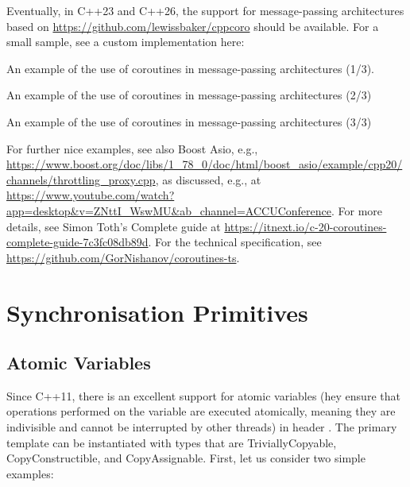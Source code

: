 \begin{itemize}
\begin{end}
Eventually, in C++23 and C++26, the support for message-passing architectures based on \url{https://github.com/lewissbaker/cppcoro} should be available. For a small sample, see a custom implementation here:

\raggedbottom
\begin{codebox}[]{\href{https://godbolt.org/z/KhYaGPn7e}{\ExternalLink}}
\footnotesize An example of the use of coroutines in message-passing architectures (1/3).
\tcblower
{}
\end{codebox}

\raggedbottom
\begin{codebox}[]{\href{https://godbolt.org/z/5vEsW6dKE}{\ExternalLink}}
\footnotesize An example of the use of coroutines in message-passing architectures (2/3)
\tcblower
{}
\end{codebox}

\raggedbottom
\begin{codebox}[]{\href{https://godbolt.org/z/vEaM8PM9s}{\ExternalLink}}
\footnotesize An example of the use of coroutines in message-passing architectures (3/3)
\tcblower
{}
\end{codebox}

For further nice examples, see also Boost Asio, e.g.,
\url{https://www.boost.org/doc/libs/1_78_0/doc/html/boost_asio/example/cpp20/channels/throttling_proxy.cpp}, 
as discussed, e.g., at
\url{https://www.youtube.com/watch?app=desktop&v=ZNttI_WswMU&ab_channel=ACCUConference}.
For more details, see Simon Toth's Complete guide at \url{https://itnext.io/c-20-coroutines-complete-guide-7c3fc08db89d}.
For the technical specification, see \url{https://github.com/GorNishanov/coroutines-ts}.

\section{Synchronisation Primitives}

\subsection{Atomic Variables}
\label{sec:atomiccpp23}

Since C++11, there is an excellent support for atomic variables (hey ensure that operations performed on the variable are executed atomically, meaning they are indivisible and cannot be interrupted by other threads) in header . 
The primary template can be instantiated with types that are TriviallyCopyable, CopyConstructible, and CopyAssignable.
First, let us consider two simple examples:


\end{end}
\end{itemize}
